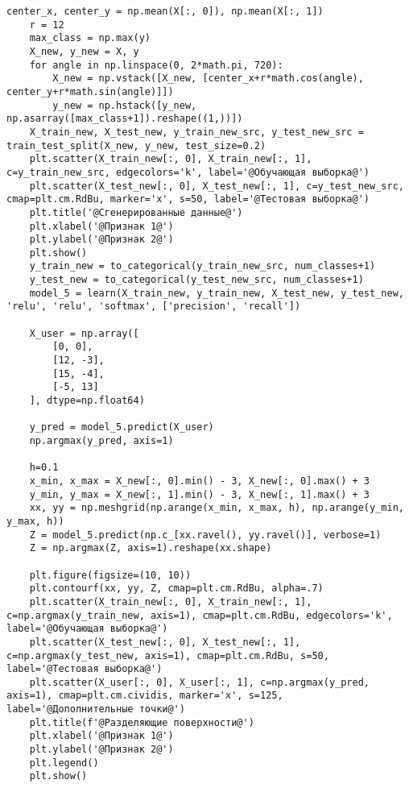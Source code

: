 \begin{lstlisting}[label=lst:1,caption=Классификация с использованием нейросетевого подхода]
	center_x, center_y = np.mean(X[:, 0]), np.mean(X[:, 1])
	r = 12
	max_class = np.max(y)
	X_new, y_new = X, y
	for angle in np.linspace(0, 2*math.pi, 720):
		X_new = np.vstack([X_new, [center_x+r*math.cos(angle), center_y+r*math.sin(angle)]])
		y_new = np.hstack([y_new, np.asarray([max_class+1]).reshape((1,))])
	X_train_new, X_test_new, y_train_new_src, y_test_new_src = train_test_split(X_new, y_new, test_size=0.2)
	plt.scatter(X_train_new[:, 0], X_train_new[:, 1], c=y_train_new_src, edgecolors='k', label='@Обучающая выборка@')
	plt.scatter(X_test_new[:, 0], X_test_new[:, 1], c=y_test_new_src, cmap=plt.cm.RdBu, marker='x', s=50, label='@Тестовая выборка@')
	plt.title('@Сгенерированные данные@')
	plt.xlabel('@Признак 1@')
	plt.ylabel('@Признак 2@')
	plt.show()
	y_train_new = to_categorical(y_train_new_src, num_classes+1)
	y_test_new = to_categorical(y_test_new_src, num_classes+1)
	model_5 = learn(X_train_new, y_train_new, X_test_new, y_test_new, 'relu', 'relu', 'softmax', ['precision', 'recall'])
	
	X_user = np.array([
		[0, 0],
		[12, -3],
		[15, -4],
		[-5, 13]
	], dtype=np.float64)
	
	y_pred = model_5.predict(X_user)
	np.argmax(y_pred, axis=1)
	
	h=0.1
	x_min, x_max = X_new[:, 0].min() - 3, X_new[:, 0].max() + 3
	y_min, y_max = X_new[:, 1].min() - 3, X_new[:, 1].max() + 3
	xx, yy = np.meshgrid(np.arange(x_min, x_max, h), np.arange(y_min, y_max, h))
	Z = model_5.predict(np.c_[xx.ravel(), yy.ravel()], verbose=1)
	Z = np.argmax(Z, axis=1).reshape(xx.shape)
	
	plt.figure(figsize=(10, 10))
	plt.contourf(xx, yy, Z, cmap=plt.cm.RdBu, alpha=.7)
	plt.scatter(X_train_new[:, 0], X_train_new[:, 1], c=np.argmax(y_train_new, axis=1), cmap=plt.cm.RdBu, edgecolors='k', label='@Обучающая выборка@')
	plt.scatter(X_test_new[:, 0], X_test_new[:, 1], c=np.argmax(y_test_new, axis=1), cmap=plt.cm.RdBu, s=50, label='@Тестовая выборка@')
	plt.scatter(X_user[:, 0], X_user[:, 1], c=np.argmax(y_pred, axis=1), cmap=plt.cm.cividis, marker='x', s=125, label='@Дополнительные точки@')
	plt.title(f'@Разделяющие поверхности@')
	plt.xlabel('@Признак 1@')
	plt.ylabel('@Признак 2@')
	plt.legend()
	plt.show()
\end{lstlisting}

\clearpage
